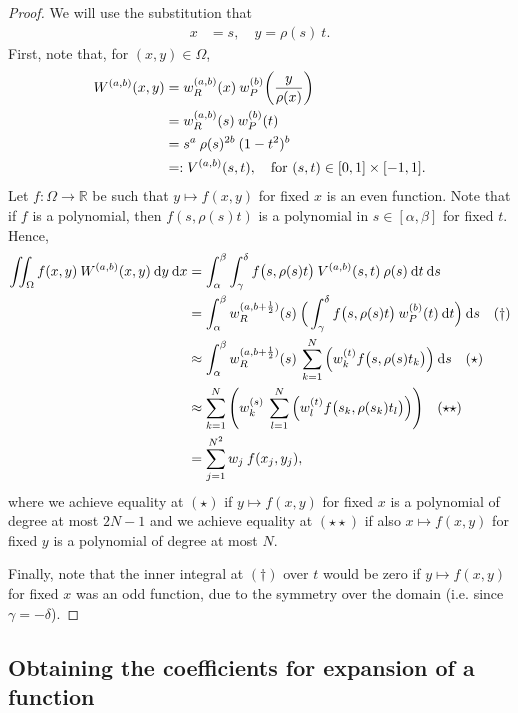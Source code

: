 \documentclass[11pt, oneside]{article}   	%
\newcommand{\half}{\frac{1}{2}}
\newcommand{\R}{\mathbb{R}}
\newcommand{\Wab}{{W^{(a,b)}}}
\newcommand{\genjac}{R}
\newcommand{\genjacw}{w_\genjac}
\begin{document}
\begin{proof}
We will use the substitution that
\begin{align*}
	x &= s, \quad y = \rho(s) \: t.
\end{align*}
First, note that, for $(x,y) \in \Omega$,
\begin{align*}
	W^{(a,b)}(x,y) &= \genjacw^{(a,b)}(x) \: w_P^{(b)}\fpr(\frac{y}{\rho(x)}) \\
	&= \genjacw^{(a,b)}(s) \: w_P^{(b)}(t) \\
	&= s^a \: \rho(s)^{2b} \: (1-t^2)^b \\
	&=: V^{(a,b)}(s,t), \quad \text{for } (s,t) \in [0,1] \times [-1,1].
\end{align*}
Let $f : \Omega \to \R$ be such that $y \mapsto f(x,y)$ for fixed $x$ is an even function. Note that if $f$ is a polynomial, then $f(s, \rho(s)t)$ is a polynomial in $s \in [\alpha,\beta]$ for fixed $t$. Hence,
\begin{align*}
	\iint_\Omega f(x,y) \: \Wab(x,y) \: \D y \: \D x &= \int_\alpha^\beta \int_\gamma^\delta f\big(s,\rho(s) t\big) \: V^{(a,b)}(s,t) \: \rho(s) \: \D t \: \D s \\
	&= \int_\alpha^\beta  \genjacw^{(a,b+\half)}(s) \: \Big( \int_\gamma^\delta f\big(s,\rho(s) t\big) \: w_P^{(b)}(t) \: \D t \Big) \: \D s \quad (\dagger) \\
	&\approx \int_\alpha^\beta  \genjacw^{(a,b+\half)}(s) \: \sum_{k=1}^N \Big( w_k^{(t)} f\big(s,\rho(s) t_k\big) \Big) \: \D s \quad (\star) \\
	&\approx \sum_{k=1}^N \Bigg( w_k^{(s)} \: \sum_{l=1}^N \Big( w_l^{(t)} f\big(s_k,\rho(s_k) t_l\big) \Big) \Bigg) \quad (\star \star) \\
	&= \sum_{j=1}^{N^2}  w_j \: f(x_j, y_j),
\end{align*}
where we achieve equality at $(\star)$ if $y \mapsto f(x,y)$ for fixed $x$ is a polynomial of degree at most $2N-1$ and we achieve equality at $(\star \star)$ if also $x \mapsto f(x,y)$ for fixed $y$ is a polynomial of degree at most $N$. 

Finally, note that the inner integral at $(\dagger)$ over $t$ would be zero if $y \mapsto f(x,y)$ for fixed $x$ was an odd function, due to the symmetry over the domain (i.e. since $\gamma = -\delta$).
\end{proof}


\subsection{Obtaining the coefficients for expansion of a function}
\end{document}
